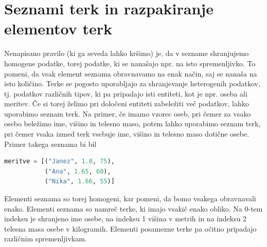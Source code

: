 \section{Seznami terk in razpakiranje elementov terk}

Nenapisano pravilo (ki ga seveda lahko kršimo) je, da v sezname shranjujemo homogene podatke, torej podatke, ki se nanašajo npr. na isto spremenljivko. To pomeni, da vsak element seznama obravnavamo na enak način, saj se nanaša na isto količino. Terke se pogosto uporabljajo za shranjevanje heterogenih podatkov, tj. podatkov različnih tipov, ki pa pripadajo isti entiteti, kot je npr. oseba ali meritev. Če si torej želimo pri določeni entiteti zabeležiti več podatkov, lahko uporabimo seznam terk. Na primer, če imamo vzorec oseb, pri čemer za vsako osebo beležimo ime, višino in telesno maso, potem lahko uporabimo seznam terk, pri čemer vsaka izmed terk vsebuje ime, višino in telesno maso dotične osebe. Primer takega seznama bi bil
\begin{lstlisting}[language=Python, showstringspaces=false]
meritve = [("Janez", 1.8, 75),
           ("Ana", 1.65, 60), 
           ("Nika", 1.66, 55)]
\end{lstlisting}
Elementi seznama so torej homogeni, kar pomeni, da bomo vsakega obravnavali enako. Elementi seznama so namreč terke, ki imajo vsakič enako obliko. Na 0-tem indeksu je shranjeno ime osebe, na indeksu 1 višina v metrih in na indeksu 2 telesna masa osebe v kilogramih. Elementi posamezne terke pa očitno pripadajo različnim spremenljivkam.

